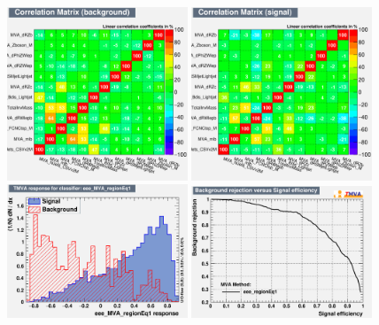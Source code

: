 \begin{figure}[htbp]
	\includegraphics[width=0.48\textwidth]{6_Search/Figures/MVAtechnics/toppairzct/eee/CorrelationMatrixB.png}
	\includegraphics[width=0.48\textwidth]{6_Search/Figures/MVAtechnics/toppairzct/eee/CorrelationMatrixS.png}
	\includegraphics[width=0.48\textwidth]{6_Search/Figures/MVAtechnics/toppairzct/eee/mva_eee_MVA_regionEq1.png}
	\includegraphics[width=0.48\textwidth]{6_Search/Figures/MVAtechnics/toppairzct/eee/rejBvsS.png}

\end{figure}
